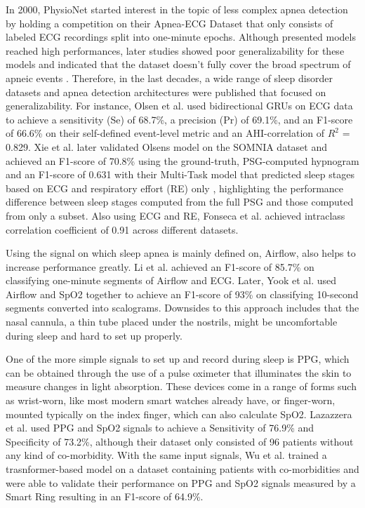 In 2000, PhysioNet started interest in the topic of less complex apnea detection by holding a competition on their Apnea-ECG Dataset that only consists of labeled ECG recordings split into one-minute epochs. Although presented models reached high performances, later studies showed poor generalizability for these models and indicated that the dataset doesn't fully cover the broad spectrum of apneic events \cite{papini2018generalizability}. Therefore, in the last decades, a wide range of sleep disorder datasets and apnea detection architectures were published that focused on generalizability.
For instance, Olsen et al. \cite{olsen2020robust} used bidirectional GRUs on ECG data to achieve a sensitivity (Se) of 68.7\%, a precision (Pr) of 69.1\%, and an F1-score of 66.6\% on their self-defined event-level metric and an AHI-correlation of $R^2$ = 0.829. Xie et al. \cite{xie2023use} later validated Olsens model on the SOMNIA dataset and achieved an F1-score of 70.8\% using the ground-truth, PSG-computed hypnogram and an F1-score of 0.631 with their Multi-Task model that predicted sleep stages based on ECG and respiratory effort (RE) only \cite{xie2024multi}, highlighting the performance difference between sleep stages computed from the full PSG and those computed from only a subset. Also using ECG and RE, Fonseca et al. \cite{fonseca2024estimating} achieved intraclass correlation coefficient of 0.91 across different datasets.

Using the signal on which sleep apnea is mainly defined on, Airflow, also helps to increase performance greatly. Li et al. \cite{li2023deep} achieved an F1-score of 85.7\% on classifying one-minute segments of Airflow and ECG. Later, Yook et al. \cite{yook2024deep} used Airflow and SpO2 together to achieve an F1-score of 93\% on classifying 10-second segments converted into scalograms.
Downsides to this approach includes that the nasal cannula, a thin tube placed under the nostrils, might be uncomfortable during sleep and hard to set up properly.

One of the more simple signals to set up and record during sleep is PPG, which can be obtained through the use of a pulse oximeter that illuminates the skin to measure changes in light absorption.
These devices come in a range of forms such as wrist-worn, like most modern smart watches already have, or finger-worn, mounted typically on the index finger, which can also calculate SpO2.
Lazazzera et al. \cite {lazazzera2020detection} used PPG and SpO2 signals to achieve a Sensitivity of 76.9\% and Specificity of 73.2\%, although their dataset only consisted of 96 patients without any kind of co-morbidity. With the same input signals, Wu et al. \cite{wu2024transformer} trained a trasnformer-based model on a dataset containing patients with co-morbidities and were able to validate their performance on PPG and SpO2 signals measured by a Smart Ring resulting in an F1-score of 64.9\%.

